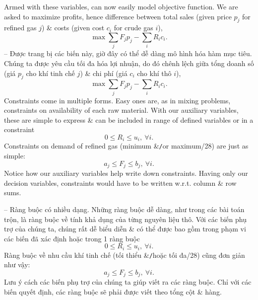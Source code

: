 \documentclass{article}
\begin{document}
\begin{itemize}
\begin{itemize}
\begin{itemize}
            Armed with these variables, can now easily model objective function. We are asked to maximize profits, hence difference between total sales (given price $p_j$ for refined gas $j$) \& costs (given cost $c_i$ for crude gas $i$),
            \begin{equation*}
                \max\sum_j F_jp_j - \sum_i R_ic_i.
            \end{equation*}
            -- Được trang bị các biến này, giờ đây có thể dễ dàng mô hình hóa hàm mục tiêu. Chúng ta được yêu cầu tối đa hóa lợi nhuận, do đó chênh lệch giữa tổng doanh số (giá $p_j$ cho khí tinh chế $j$) \& chi phí (giá $c_i$ cho khí thô $i$),
            \begin{equation*}
                \max\sum_j F_jp_j - \sum_i R_ic_i.
            \end{equation*}
            Constraints come in multiple forms. Easy ones are, as in mixing problems, constraints on availability of each raw material. With our auxiliary variables, these are simple to express \& can be included in range of defined variables or in a constraint
            \begin{equation*}
                0\le R_i\le u_i,\ \forall i.
            \end{equation*}
            Constraints on demand of refined gas (minimum \&{\tt/}or maximum/28) are just as simple:
            \begin{equation*}
                a_j\le F_j\le b_j,\ \forall i.
            \end{equation*}
            Notice how our auxiliary variables help write down constraints. Having only our decision variables, constraints would have to be written w.r.t. column \& row sums.

            -- Ràng buộc có nhiều dạng. Những ràng buộc dễ dàng, như trong các bài toán trộn, là ràng buộc về tính khả dụng của từng nguyên liệu thô. Với các biến phụ trợ của chúng ta, chúng rất dễ biểu diễn \& có thể được bao gồm trong phạm vi các biến đã xác định hoặc trong 1 ràng buộc
            \begin{equation*}
                0\le R_i\le u_i,\ \forall i.
            \end{equation*}
            Ràng buộc về nhu cầu khí tinh chế (tối thiểu \&{\tt/}hoặc tối đa/28) cũng đơn giản như vậy:
            \begin{equation*}
                a_j\le F_j\le b_j,\ \forall i.
            \end{equation*}
            Lưu ý cách các biến phụ trợ của chúng ta giúp viết ra các ràng buộc. Chỉ với các biến quyết định, các ràng buộc sẽ phải được viết theo tổng cột \& hàng.


\end{itemize}
\end{itemize}
\end{itemize}
\end{document}
